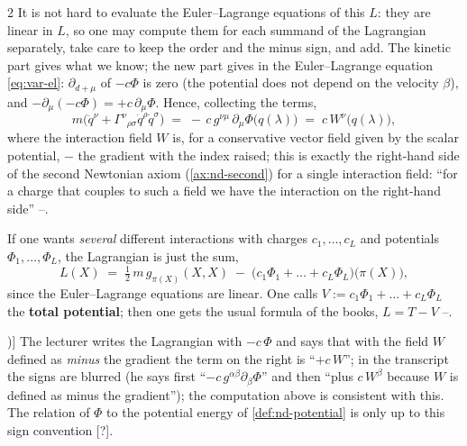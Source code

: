 \begin{paracol}{2}
It is not hard to evaluate the Euler--Lagrange equations of this $L$: they are linear in $L$, so one may compute them for each summand of the Lagrangian separately, take care to keep the order and the minus sign, and add. The kinetic part gives what we know; the new part gives in the Euler--Lagrange equation \eqref{eq:var-el}: $\partial_{d+\mu}$ of $-c\Phi$ is zero (the potential does not depend on the velocity $\beta$), and $-\partial_\mu(-c\Phi)=+c\,\partial_\mu\Phi$. Hence, collecting the terms,
\begin{equation}\label{eq:var-elcoupled}
  m\bigl(\ddot q^\nu+\Gamma^\nu{}_{\rho\sigma}\dot q^\rho\dot q^\sigma\bigr)\;=\;-\,c\,g^{\nu\mu}\,\partial_\mu\Phi\bigl(q(\lambda)\bigr)\;=\;c\,W^\nu\bigl(q(\lambda)\bigr),
\end{equation}
where the interaction field $W$ is, for a conservative vector field given by the scalar potential, $-$ the gradient with the index raised; this is exactly the right-hand side of the second Newtonian axiom (\cref{ax:nd-second}) for a single interaction field: ``for a charge that couples to such a field we have the interaction on the right-hand side'' --.

If one wants \emph{several} different interactions with charges $c_1,\dots,c_L$ and potentials $\Phi_1,\dots,\Phi_L$, the Lagrangian is just the sum,
\begin{equation}\label{eq:var-Lgeneral}
  L(X)\;=\;\tfrac12\,m\,g_{\pi(X)}(X,X)\;-\;\bigl(c_1\Phi_1+\dots+c_L\Phi_L\bigr)\bigl(\pi(X)\bigr),
\end{equation}
since the Euler--Lagrange equations are linear. One calls $V:=c_1\Phi_1+\dots+c_L\Phi_L$ the \textbf{total potential}; then one gets the usual formula of the books, $L=T-V$ --.

\begin{coursenote}[Sign of the potential and the field (as said in class, [?])]\label{cn:var-sign}
The lecturer writes the Lagrangian with $-c\,\Phi$ and says that with the field $W$ defined as \emph{minus} the gradient the term on the right is ``$+c\,W$''; in the transcript the signs are blurred (he says first ``$-c\,g^{\alpha\beta}\partial_\beta\Phi$'' and then ``plus $c\,W^\beta$ because $W$ is defined as minus the gradient''); the computation above is consistent with this. The relation of $\Phi$ to the potential energy of \cref{def:nd-potential} is only up to this sign convention [?].
\end{coursenote}


\end{paracol}
